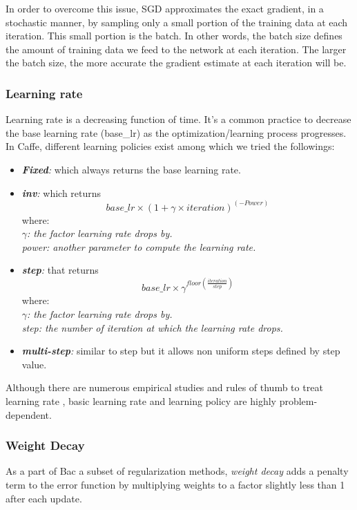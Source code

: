 \indent In order to overcome this issue, SGD approximates the exact gradient, in a stochastic manner, by sampling only a small portion of the training data at each iteration. This small portion is the batch. In other words, the batch size defines the amount of training data we feed to the network at each iteration. The larger the batch size, the more accurate the gradient estimate at each iteration will be. 

\subsubsection{Learning rate}
\label{learning rate}
Learning rate is a decreasing function of time. It's a common practice to decrease the base learning rate (base\_lr) as the optimization/learning process progresses. In Caffe, different learning policies exist among which we tried the followings:
\begin{itemize}
\item \textit{\textbf{Fixed}:} which always returns the base learning rate.

\item \textit{\textbf{inv}:} which returns $$base\_lr \times (1 + \gamma \times iteration) ^ {(-Power)}$$ where:\\\textit{ $\gamma$: the factor learning rate drops by.}\\\textit{power: another parameter to compute the learning rate.}

\item \textit{\textbf{step}:} that returns $$base\_lr \times \gamma ^ {floor(\frac{iteration}{step})}$$ where:\\ \textit{$\gamma$: the factor learning rate drops by.}\\\textit{step: the number of iteration at which the learning rate drops.} 
\item \textit{\textbf{multi-step}:} similar to step but it allows non uniform steps defined by step value.
\end{itemize}
Although there are numerous empirical studies and rules of thumb to treat learning rate \cite{senior2013empirical,yu1995dynamic,minai1990acceleration}, basic learning rate and learning policy are highly problem-dependent.  

\subsubsection{Weight Decay}


As a part of Bac a subset of regularization methods, \textit{weight decay} adds a penalty term to the error function by multiplying weights to a factor slightly less than 1 after each update. 

